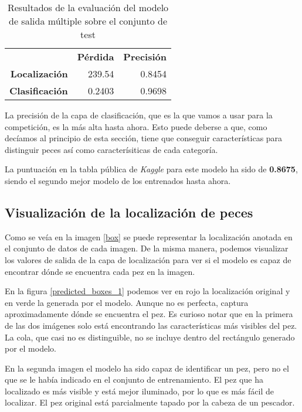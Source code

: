 \begin{table}[]
\centering
\caption{Resultados de la evaluación del modelo de salida múltiple sobre el
conjunto de test}
\label{eval_multi}
\begin{tabular}{rrr}
                       & \textbf{Pérdida} & \textbf{Precisión} \\
\textbf{Localización}  & 239.54                        & 0.8454             \\
\textbf{Clasificación} & 0.2403                        & 0.9698            
\end{tabular}
\end{table}

La precisión de la capa de clasificación, que es la que vamos a usar para la
competición, es la más alta hasta ahora. Esto puede deberse a que, como
decíamos al principio de esta sección, tiene que conseguir características para
distinguir peces así como caracterísiticas de cada categoría.

La puntuación en la tabla pública de \textit{Kaggle} para este modelo ha sido
de \textbf{0.8675}, siendo el segundo mejor modelo de los entrenados hasta ahora.

\subsection{Visualización de la localización de peces}

Como se veía en la imagen \ref{box} se puede representar la localización anotada
en el conjunto de datos de cada imagen. De la misma manera, podemos visualizar
los valores de salida de la capa de localización para ver si el modelo es capaz
de encontrar dónde se encuentra cada pez en la imagen.

En la figura \ref{predicted_boxes_1} podemos ver en rojo la localización original
y en verde la generada por el modelo. Aunque no es perfecta, captura
aproximadamente dónde se encuentra el pez. Es curioso notar que en la primera de
las dos imágenes solo está encontrando las características más visibles del pez.
La cola, que casi no es distinguible, no se incluye dentro del rectángulo
generado por el modelo.

En la segunda imagen el modelo ha sido capaz de identificar un pez, pero no el que
se le había indicado en el conjunto de entrenamiento. El pez que ha localizado
es más visible y está mejor iluminado, por lo que es más fácil de localizar. El pez
original está parcialmente tapado por la cabeza de un pescador.


